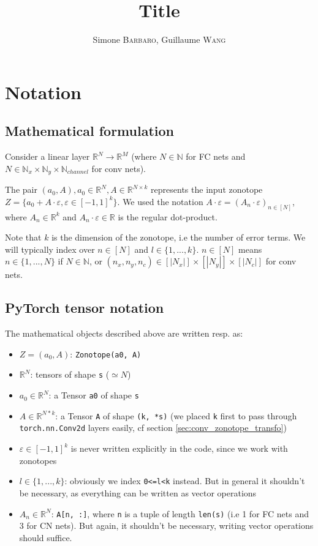 \documentclass{article}
\title{Title}
\author{Simone \textsc{Barbaro}, Guillaume \textsc{Wang}}
\newcommand{\code}[1]{\texttt{#1}}
\newcommand{\RR}{\mathbb{R}}
\newcommand{\NN}{\mathbb{N}}
\newcommand{\eps}{\varepsilon}
\begin{document}

\section{Notation}

\subsection{Mathematical formulation}

Consider a linear layer $\RR^N \to \RR^M$ (where $N \in \NN$ for FC nets and $N \in \NN_x \times \NN_y \times \NN_{channel}$ for conv nets).

The pair $(a_0, A), a_0 \in \RR^N, A \in \RR^{N \times k}$ represents the input zonotope $Z = \{ a_0 + A \cdot \eps, \eps \in [-1, 1]^k \}$. We used the notation $A \cdot \eps = (A_n \cdot \eps)_{n \in [N]}$, where $A_n \in \RR^k$ and $A_n \cdot \eps \in \RR$ is the regular dot-product.

Note that $k$ is the dimension of the zonotope, i.e the number of error terms. We will typically index over $n \in [N]$ and $l \in \{1,..., k\}$. 
$n \in [N]$ means $n \in \{1,...,N\}$ if $N \in \NN$, or $(n_x, n_y, n_c) \in [|N_x|] \times [|N_y|] \times [|N_c|]$ for conv nets.

\subsection{PyTorch tensor notation}

The mathematical objects described above are written resp. as:
\begin{itemize}
    \item $Z = (a_0, A)$: \code{Zonotope(a0, A)}
    \item $\RR^N$: tensors of shape \code{s} ($\simeq N$)
    \item $a_0 \in \RR^N$: a Tensor \code{a0} of shape \code{s}
    \item $A \in \RR^{N*k}$: a Tensor \code{A} of shape \code{(k, *s)} (we placed \code{k} first to pass through \code{torch.nn.Conv2d} layers easily, cf section \ref{sec:conv_zonotope_transfo})
    \item $\eps \in [-1, 1]^k$ is never written explicitly in the code, since we work with zonotopes
    \item $l \in \{1,...,k\}$: obviously we index \code{0<=l<k} instead. But in general it shouldn't be necessary, as everything can be written as vector operations
    \item $A_n \in \RR^N$: \code{A[n, :]}, where \code{n} is a tuple of length \code{len(s)} (i.e 1 for FC nets and 3 for CN nets). But again, it shouldn't be necessary, writing vector operations should suffice.
\end{itemize}
\end{document}
